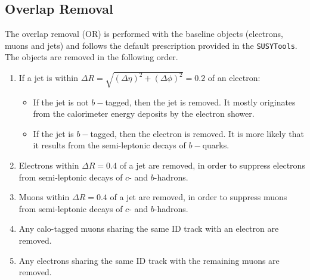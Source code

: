 \subsection{Overlap Removal}
\label{sec:overlapRemoval}
The overlap removal (OR) is performed with the baseline objects (electrons, muons and jets) and follows the default prescription provided in the \texttt{SUSYTools}.
The objects are removed in the following order.
\begin{enumerate}
\item If a jet is within $\Delta R= \sqrt{(\Delta \eta)^2 + (\Delta \phi)^2}=0.2$ of an electron:
\begin{itemize}
\item If the jet is not $b-$tagged, then the jet is removed. It mostly originates from the calorimeter energy deposits by the electron shower.
\item If the jet is $b-$tagged, then the electron is removed. It is more likely that it results from the semi-leptonic decays of $b-$quarks.
\end{itemize}
\item Electrons within $\Delta R=0.4$ of a jet are removed, in order to suppress electrons from semi-leptonic decays of $c$- and $b$-hadrons.
\item Muons within $\Delta R=0.4$ of a jet are removed, in order to suppress muons from semi-leptonic decays of $c$- and $b$-hadrons.
\item Any calo-tagged muons sharing the same ID track with an electron are removed.
\item Any electrons sharing the same ID track with the remaining muons are removed.
\end{enumerate}
